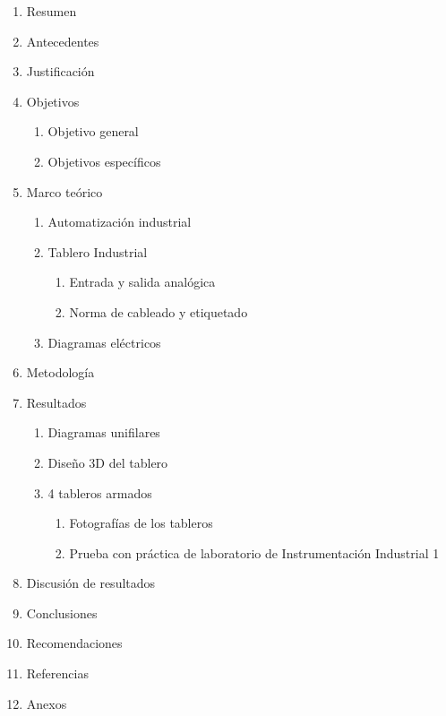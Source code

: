  \begin{enumerate}
   \item Resumen
   
   \item Antecedentes
   
   \item Justificación
   
   \item Objetivos
   \begin{enumerate}
     \item Objetivo general
     \item Objetivos específicos
   \end{enumerate}
   
   \item Marco teórico
   \begin{enumerate}
     \item Automatización industrial
     \item Tablero Industrial
        \begin{enumerate}
            \item Entrada y salida analógica
            \item Norma de cableado y etiquetado
        \end{enumerate}
     \item Diagramas eléctricos
   \end{enumerate}
   
   \item Metodología
   
   \item Resultados
   \begin{enumerate}
     \item Diagramas unifilares
     \item Diseño 3D del tablero
     \item 4 tableros armados
        \begin{enumerate}
            \item Fotografías de los tableros
            \item Prueba con práctica de laboratorio de Instrumentación Industrial 1
        \end{enumerate}
   \end{enumerate}
   
   \item Discusión de resultados
   
   \item Conclusiones
   
   \item Recomendaciones
   
   \item Referencias
   
   \item Anexos
   
 \end{enumerate}
